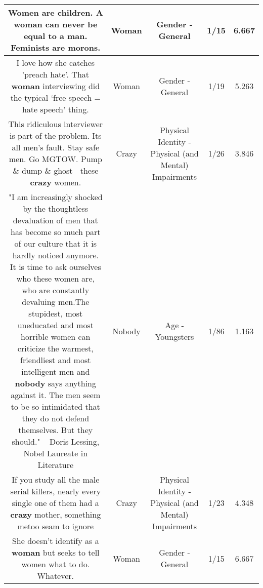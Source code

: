 \documentclass[11pt]{article}
\newlength\mylength
\begin{document}
\begin{center}
\begin{longtable}{|C{.65\mylength}|C{.30\mylength}|C{.12\mylength}|C{.12\mylength}|C{.12\mylength}|}
  \small Women are children.  A \textbf{woman} can never be equal to a man.  Feminists are morons.\normalsize   & Woman & Gender - General & 1/15 & 6.667 \\  \hline
  \small I love how she catches 'preach hate'. That \textbf{woman} interviewing did the typical ‘free speech = hate speech' thing.\normalsize   & Woman & Gender - General & 1/19 & 5.263 \\  \hline
  \small This ridiculous interviewer is part of the problem. Its all men's fault. Stay safe men. Go MGTOW. Pump \& dump \& ghost 👻 these \textbf{crazy} women.\normalsize   & Crazy & Physical Identity - Physical (and Mental) Impairments & 1/26 & 3.846 \\  \hline
  \small "I am increasingly shocked by the thoughtless devaluation of men that has become so much part of our culture that it is hardly noticed anymore. It is time to ask ourselves who these women are, who are constantly devaluing men.The stupidest, most uneducated and most horrible women can criticize the warmest, friendliest and most intelligent men and \textbf{nobody} says anything against it. The men seem to be so intimidated that they do not defend themselves. But they should."   ~ Doris Lessing, Nobel Laureate in Literature\normalsize   & Nobody & Age - Youngsters & 1/86 & 1.163 \\  \hline
  \small If you study all the male serial killers, nearly every single one of them had a \textbf{crazy} mother, something metoo seam to ignore\normalsize   & Crazy & Physical Identity - Physical (and Mental) Impairments & 1/23 & 4.348 \\  \hline
  \small She doesn't identify as a \textbf{woman} but seeks to tell women what to do. Whatever.\normalsize   & Woman & Gender - General & 1/15 & 6.667 \\  \hline

\end{longtable}
\end{center}
\end{document}
